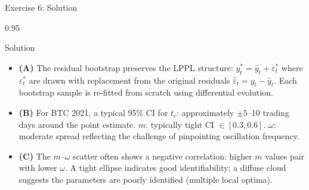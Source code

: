 \documentclass[9pt, aspectratio=169, t]{beamer}
\begin{document}
\begin{frame}{Exercise 6: Solution}
    \begin{cminipage}{0.95\textwidth}
    \begin{exampleblock}{Solution}
        {\small
        \begin{itemize}\setlength{\itemsep}{3pt}
            \item \textcolor{MainBlue}{\textbf{(A)}} The residual bootstrap preserves the LPPL structure: $y^*_t = \hat{y}_t + \varepsilon^*_t$ where $\varepsilon^*_t$ are drawn with replacement from the original residuals $\hat{\varepsilon}_t = y_t - \hat{y}_t$. Each bootstrap sample is re-fitted from scratch using differential evolution.
            \item \textcolor{MainBlue}{\textbf{(B)}} For BTC 2021, a typical 95\% CI for $t_c$: approximately $\pm 5$--10 trading days around the point estimate. $m$: typically tight CI $\in [0.3, 0.6]$. $\omega$: moderate spread reflecting the challenge of pinpointing oscillation frequency.
            \item \textcolor{MainBlue}{\textbf{(C)}} The $m$--$\omega$ scatter often shows a negative correlation: higher $m$ values pair with lower $\omega$. A tight ellipse indicates good identifiability; a diffuse cloud suggests the parameters are poorly identified (multiple local optima).
        \end{itemize}
        }
    \end{exampleblock}
    \end{cminipage}
\end{frame}
\end{document}
